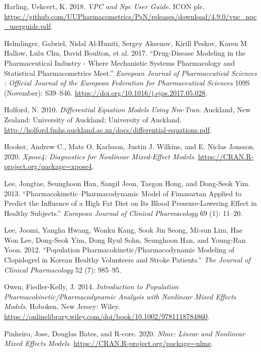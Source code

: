 \documentclass[
  11pt,
  krantz2,
  a4paper]{krantz}
\newlength{\cslhangindent}
\newenvironment{cslreferences}%
  {\setlength{\parindent}{0pt}%
  \everypar{\setlength{\hangindent}{\cslhangindent}}\ignorespaces}%
  {\par}
\theoremstyle{definition}
\theoremstyle{definition}
\theoremstyle{definition}
\theoremstyle{remark}
\begin{document}
\begin{cslreferences}
\leavevmode\hypertarget{ref-vpcnpc}{}%
Harling, Uekcert, K. 2018. \emph{VPC and Npc User Guide}. ICON plc. \url{https://github.com/UUPharmacometrics/PsN/releases/download/4.9.0/vpc_npc_userguide.pdf}.

\leavevmode\hypertarget{ref-helmlinger2017drug}{}%
Helmlinger, Gabriel, Nidal Al-Huniti, Sergey Aksenov, Kirill Peskov, Karen M Hallow, Lulu Chu, David Boulton, et al. 2017. ``Drug-Disease Modeling in the Pharmaceutical Industry - Where Mechanistic Systems Pharmacology and Statistical Pharmacometrics Meet.'' \emph{European Journal of Pharmaceutical Sciences : Official Journal of the European Federation for Pharmaceutical Sciences} 109S (November): S39--S46. \url{https://doi.org/10.1016/j.ejps.2017.05.028}.

\leavevmode\hypertarget{ref-nickholford}{}%
Holford, N. 2010. \emph{Differential Equation Models Using Nm-Tran}. Auckland, New Zealand: University of Auckland; University of Auckland. \url{http://holford.fmhs.auckland.ac.nz/docs/differential-equations.pdf}.

\leavevmode\hypertarget{ref-R-xpose4}{}%
Hooker, Andrew C., Mats O. Karlsson, Justin J. Wilkins, and E. Niclas Jonsson. 2020. \emph{Xpose4: Diagnostics for Nonlinear Mixed-Effect Models}. \url{https://CRAN.R-project.org/package=xpose4}.

\leavevmode\hypertarget{ref-lee2013pharmacokinetic}{}%
Lee, Jongtae, Seunghoon Han, Sangil Jeon, Taegon Hong, and Dong-Seok Yim. 2013. ``Pharmacokinetic--Pharmacodynamic Model of Fimasartan Applied to Predict the Influence of a High Fat Diet on Its Blood Pressure-Lowering Effect in Healthy Subjects.'' \emph{European Journal of Clinical Pharmacology} 69 (1): 11--20.

\leavevmode\hypertarget{ref-lee2012population}{}%
Lee, Joomi, Yangha Hwang, Wonku Kang, Sook Jin Seong, Mi-sun Lim, Hae Won Lee, Dong-Seok Yim, Dong Ryul Sohn, Seunghoon Han, and Young-Ran Yoon. 2012. ``Population Pharmacokinetic/Pharmacodynamic Modeling of Clopidogrel in Korean Healthy Volunteers and Stroke Patients.'' \emph{The Journal of Clinical Pharmacology} 52 (7): 985--95.

\leavevmode\hypertarget{ref-kelly}{}%
Owen, Fiedler-Kelly, J. 2014. \emph{Introduction to Population Pharmacokinetic/Pharmacodynamic Analysis with Nonlinear Mixed Effects Models}. Hoboken, New Jersey: Wiley. \url{https://onlinelibrary.wiley.com/doi/book/10.1002/9781118784860}.

\leavevmode\hypertarget{ref-R-nlme}{}%
Pinheiro, Jose, Douglas Bates, and R-core. 2020. \emph{Nlme: Linear and Nonlinear Mixed Effects Models}. \url{https://CRAN.R-project.org/package=nlme}.


\end{cslreferences}
\end{document}
